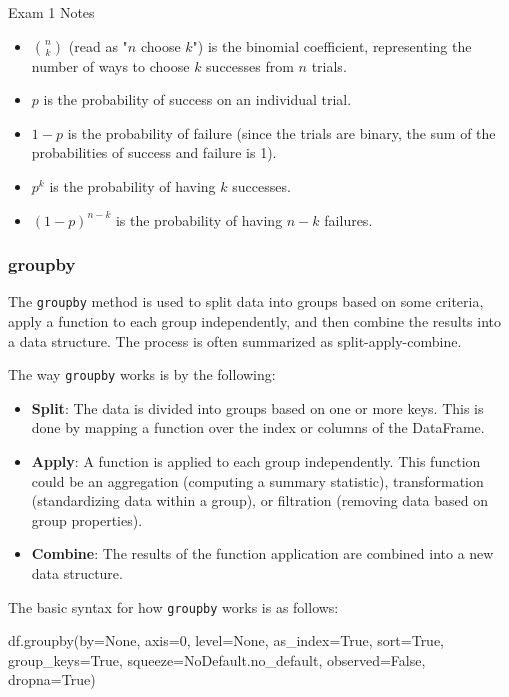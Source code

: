 \begin{examnotes}{Exam 1 Notes}
\begin{itemize}
\begin{itemize}
\begin{itemize}
                \item $\binom{n}{k}$ (read as "$n$ choose $k$") is the binomial coefficient, representing the number of ways to choose $k$ successes from $n$ trials.
                \item $p$ is the probability of success on an individual trial.
                \item $1 - p$ is the probability of failure (since the trials are binary, the sum of the probabilities of success and failure is 1).
                \item $p^{k}$ is the probability of having $k$ successes.
                \item $(1 - p)^{n - k}$ is the probability of having $n - k$ failures.
            \end{itemize}
        \end{itemize}
    \end{itemize}

    \subsubsection*{groupby}

    The \texttt{groupby} method is used to split data into groups based on some criteria, apply a function to each group independently, and then combine the results into a data structure. The process 
    is often summarized as split-apply-combine.

    The way \texttt{groupby} works is by the following:

    \begin{itemize}
        \item \textbf{Split}: The data is divided into groups based on one or more keys. This is done by mapping a function over the index or columns of the DataFrame.
        \item \textbf{Apply}: A function is applied to each group independently. This function could be an aggregation (computing a summary statistic), transformation (standardizing data within a group), 
        or filtration (removing data based on group properties).
        \item \textbf{Combine}: The results of the function application are combined into a new data structure.
    \end{itemize}

    The basic syntax for how \texttt{groupby} works is as follows:

    \begin{code}[Python]
    df.groupby(by=None, axis=0, level=None, as_index=True, sort=True, group_keys=True, squeeze=NoDefault.no_default, observed=False, dropna=True)
    \end{code}


\end{examnotes}
